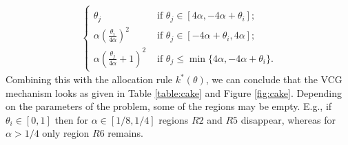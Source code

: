 \documentclass[a4paper]{article}
\begin{document}
\begin{enumerate}
\begin{align*}
\begin{cases}
			\\
			\theta_j
			& \text{ if } \theta_j \in [4 \alpha, -4 \alpha + \theta_i];
			\\
			\alpha \left( \frac{\theta_i}{4\alpha}\right)^2
			& \text{ if } \theta_j \in [-4 \alpha + \theta_i, 4 \alpha];
			\\
			\alpha \left( \frac{\theta_j}{4\alpha} + 1 \right)^2
			& \text{ if } \theta_j \leq \min \{4 \alpha, -4 \alpha + \theta_i\}.
		\end{cases}
	\end{align*}
	Combining this with the allocation rule $k^*(\theta)$, we can conclude that the VCG mechanism looks as given in Table \ref{table:cake} and Figure \ref{fig:cake}. Depending on the parameters of the problem, some of the regions may be empty. E.g., if $\theta_i\in[0,1]$ then for $\alpha \in [1/8,1/4]$ regions $R2$ and $R5$ disappear, whereas for $\alpha > 1/4$ only region $R6$ remains.
	

\end{enumerate}
\end{document}
